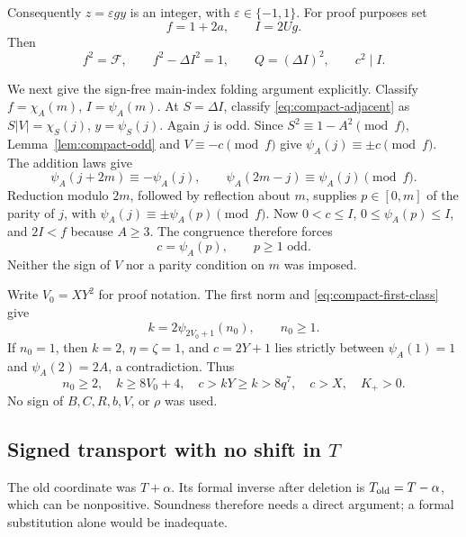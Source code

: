 Consequently \(z=\varepsilon gy\) is an integer, with
\(\varepsilon\in\{-1,1\}\).  For proof purposes set
\begin{equation}
 f=1+2a,\qquad I=2Ug.
 \label{eq:compact-proofpair}
\end{equation}
Then
\begin{equation}
 f^2=\mathcal F,\qquad f^2-\Delta I^2=1,\qquad
 Q=(\Delta I)^2,\qquad c^2\mid I.                 \label{eq:compact-strongnorm}
\end{equation}

We next give the sign-free main-index folding argument explicitly.
Classify \(f=\chi_A(m)\), \(I=\psi_A(m)\).
At \(S=\Delta I\), classify \eqref{eq:compact-adjacent} as
\(S|V|=\chi_S(j)\), \(y=\psi_S(j)\).  Again \(j\) is odd.
Since \(S^2\equiv1-A^2\pmod f\),
Lemma~\ref{lem:compact-odd} and \(V\equiv-c\pmod f\) give
\(\psi_A(j)\equiv\pm c\pmod f\).  The addition laws give
\[
 \psi_A(j+2m)\equiv-\psi_A(j),\qquad
 \psi_A(2m-j)\equiv\psi_A(j)\pmod f.
\]
Reduction modulo \(2m\), followed by reflection about \(m\), supplies
\(p\in[0,m]\) of the parity of \(j\), with
\(\psi_A(j)\equiv\pm\psi_A(p)\pmod f\).
Now \(0<c\le I\), \(0\le\psi_A(p)\le I\), and \(2I<f\) because
\(A\ge3\).  The congruence therefore forces
\begin{equation}
 c=\psi_A(p),\qquad p\ge1\text{ odd}.              \label{eq:compact-folded}
\end{equation}
Neither the sign of \(V\) nor a parity condition on \(m\) was imposed.

Write \(V_0=XY^2\) for proof notation.  The first norm and
\eqref{eq:compact-first-class} give
\[
 k=2\psi_{2V_0+1}(n_0),\qquad n_0\ge1.
\]
If \(n_0=1\), then \(k=2\), \(\eta=\zeta=1\), and \(c=2Y+1\)
lies strictly between \(\psi_A(1)=1\) and \(\psi_A(2)=2A\), a
contradiction.  Thus
\begin{equation}
 n_0\ge2,\quad k\ge8V_0+4,\quad
 c>kY\ge k>8q^7,\quad c>X,\quad K_+>0.           \label{eq:compact-earlybound}
\end{equation}
No sign of \(B,C,R,b,V\), or \(\rho\) was used.

\subsection{Signed transport with no shift in \texorpdfstring{$T$}{T}}
\label{subsec:compact-sign}

The old coordinate was \(T+\alpha\).  Its formal inverse after deletion
is \(T_{\rm old}=T-\alpha\), which can be nonpositive.  Soundness therefore
needs a direct argument; a formal substitution alone would be inadequate.
\cite{unshift}

